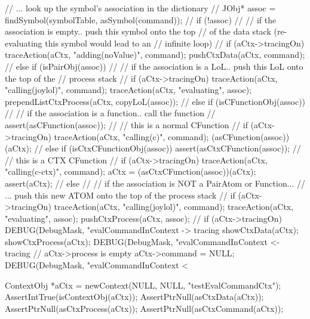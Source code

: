 {{{      //  ... look up the symbol's association in the dictionary
      //
      JObj* assoc = findSymbol(symbolTable, asSymbol(command));
      //
      if (!assoc) {
        //
        // if the association is empty.. push this symbol onto the top
        // of the data stack (re-evaluating this symbol would lead to an
        // infinite loop)
        //
        if (aCtx->tracingOn)
          traceAction(aCtx, "adding(noValue)", command);
        pushCtxData(aCtx, command);
        //
      } else if (isPairObj(assoc)) {
        //
        // if the association is a LoL.. push this LoL onto the top of the
        // process stack
        //
        if (aCtx->tracingOn) {
          traceAction(aCtx, "calling(joylol)", command);
          traceAction(aCtx, "evaluating",      assoc);
        }
        prependListCtxProcess(aCtx, copyLoL(assoc));
        //
      } else if (isCFunctionObj(assoc)) {
        //
        // if the association is a function.. call the function
        //
        assert(asCFunction(assoc));
        //
        // this is a normal CFunction
        //
        if (aCtx->tracingOn)
          traceAction(aCtx, "calling(c)", command);
        (asCFunction(assoc))(aCtx);
        //
      } else if (isCtxCFunctionObj(assoc)) {
        assert(asCtxCFunction(assoc));
        //
        // this is a CTX CFunction
        //
        if (aCtx->tracingOn) 
          traceAction(aCtx, "calling(c-ctx)", command);
        aCtx = (asCtxCFunction(assoc))(aCtx);
        assert(aCtx);
        //
      } else {
        //
        // if the association is NOT a PairAtom or Function...
        // ... push this new ATOM onto the top of the process stack
        //
        if (aCtx->tracingOn) {
          traceAction(aCtx, "calling(joylol)", command);
          traceAction(aCtx, "evaluating",      assoc);
        }
        pushCtxProcess(aCtx, assoc);
        //
      }
    }
    if (aCtx->tracingOn) {
      DEBUG(DebugMask, "evalCommandInContext -> tracing%
      showCtxData(aCtx);
      showCtxProcess(aCtx);
      DEBUG(DebugMask, "evalCommandInContext <- tracing%
    }
  } // aCtx->process is empty
  aCtx->command = NULL;
  DEBUG(DebugMask, "evalCommandInContext < %
}
\stopCCode


\startCTest
  ContextObj *aCtx = newContext(NULL, NULL, "testEvalCommandCtx");
  AssertIntTrue(isContextObj(aCtx));
  AssertPtrNull(asCtxData(aCtx));
  AssertPtrNull(asCtxProcess(aCtx));
  AssertPtrNull(asCtxCommand(aCtx));
  
